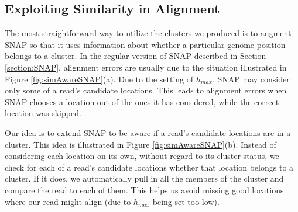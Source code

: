 \documentclass[twocolumn,10pt]{article}
\begin{document}
\subsection{Exploiting Similarity in Alignment}
\label{section:exploitingSimilarityInAlignment}

The most straightforward way to utilize the clusters we produced is to augment SNAP so that it uses information about whether a particular genome position belongs to a cluster.  In the regular version of SNAP described in Section \ref{section:SNAP}, alignment errors are usually due to the situation illustrated in Figure \ref{fig:simAwareSNAP}(a).  Due to the setting of \(h_{max}\), SNAP may consider only some of a read's candidate locations.  This leads to alignment errors when SNAP chooses a location out of the ones it has considered, while the correct location was skipped.

Our idea is to extend SNAP to be aware if a read's candidate locations are in a cluster.  This idea is illustrated in Figure \ref{fig:simAwareSNAP}(b).  Instead of considering each location on its own, without regard to its cluster status, we check for each of a read's candidate locations whether that location belongs to a cluster.  If it does, we automatically pull in all the members of the cluster and compare the read to each of them.  This helps us avoid missing good locations where our read might align (due to \(h_{max}\) being set too low).
\end{document}
